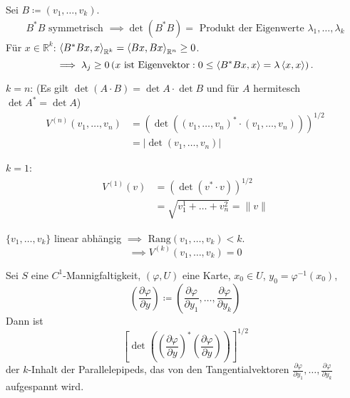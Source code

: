 \begin{notice} \label{thm:11.2}
  \begin{enum-arab}
    \item Sei $B \coloneq (v_1 ,\ldots, v_k)$.
    \begin{align*}
      B^* B \text{ symmetrisch } \implies \det(B^* B) = \text{ Produkt der Eigenwerte } \lambda_1, \ldots, \lambda_k
    \end{align*}
    Für $x \in \mathbb{R}^k$: $\braket{B^* B x, x}_{\mathbb{R}^k} = \braket{B x, B x}_{\mathbb{R}^n} \geq 0$. \[ \implies \lambda_j \geq 0 \left( x \text{ ist Eigenvektor} : 0 \leq \braket{B^* B x, x} = \lambda \braket{x, x} \right). \]
    
    \item $k=n$: (Es gilt $\det(A \cdot B) = \det A \cdot \det B$ und für $A$ hermitesch $\det A^* = \det A$)
    \begin{align*}
      V^{(n)}(v_1 ,\ldots, v_n)
      &= \left(\det \left( (v_1 ,\ldots, v_n)^* \cdot (v_1 ,\ldots, v_n)\right)\right)^{1/2} \\
      &= \left| \det (v_1 ,\ldots, v_n) \right|
    \end{align*}
    
    \item $k=1$:
    \begin{align*}
      V^{(1)}(v)
      &= \left( \det(v^* \cdot v) \right)^{1/2} \\
      &= \sqrt{v_1^1 + \ldots + v_n^2}
      = \|v\|
    \end{align*}
    
    \item $\{ v_1 ,\ldots, v_k \}$ linear abhängig $\implies$ $\mathrm{Rang}(v_1,\ldots,v_k) < k$. \[ \implies V^{(k)}(v_1,\ldots,v_k) = 0 \]
    
    \item Sei $S$ eine $C^1$-Mannigfaltigkeit, $(\varphi,U)$ eine Karte, $x_0 \in U$, $y_0 = \varphi^{-1}(x_0)$,\[ \left(\frac{\partial \varphi}{\partial y}\right) \coloneq \left( \frac{\partial \varphi}{\partial y_1},\ldots,\frac{\partial \varphi}{\partial y_k} \right) \]
    Dann ist \[ \left[ \det \left( \left( \frac{\partial \varphi}{\partial y} \right)^* \left( \frac{\partial \varphi}{\partial y} \right) \right) \right]^{1/2} \]
    der $k$-Inhalt der Parallelepipeds, das von den Tangentialvektoren $\frac{\partial \varphi}{\partial y_1},\ldots,\frac{\partial \varphi}{\partial y_k}$ aufgespannt wird.
  \end{enum-arab}
\end{notice}

